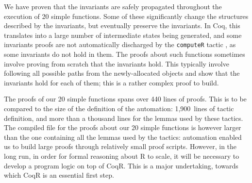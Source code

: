 \documentclass[
    sigplan,
    10pt,
    review, %
    natbib=false %
 ]{acmart}
\newcommand\et[1]{\todo[color=blue!20,size=\scriptsize]{#1}}
\newcommand\CoqR{CoqR}
\newcommand\newtext[1]{{\color{blue} #1}}
\begin{document}
We have proven that the invariants are safely propagated throughout the execution of 20 simple functions.
Some of these significantly change the structures described by the invariants,
but eventually preserve the invariants. 
In Coq, this translates into a large number of intermediate states being generated,
and some invariants proofs are not automatically discharged by the \texttt{computeR} tactic
\newtext{, as some invariants do not hold in them}.
The proofs about such functions sometimes
involve proving from scratch that the invariants hold.
This typically involve following all possible paths
from the newly-allocated objects and show that the invariants hold for each of them; this is a rather complex proof to build.

The proofs of our 20 simple functions spans over 440 lines of proofs.
This is to be compared to the size of the definition of the automation:
1,900~lines of tactic definition,
and more than a thousand lines for the lemmas used by these tactics.
The compiled file for the proofs about our 20 simple functions
is however larger than the one containing all the lemmas used by the tactics:
automation enabled us to build large proofs through relatively small proof scripts.
%
%
However, in the long run, in order for formal reasoning about R to scale, it will be necessary to develop a program logic on top of \CoqR.
This is a major undertaking, towards which \CoqR{} is an essential first step.

\end{document}

